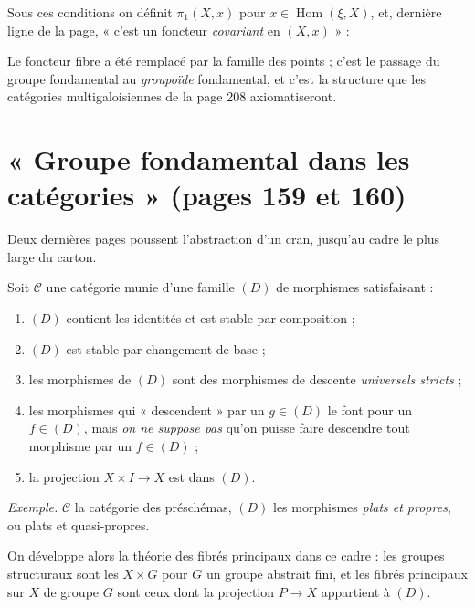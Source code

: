 \documentclass[11pt,a4paper]{article}
\begin{document}
Sous ces conditions on définit $\pi_{1}(X, x)$ pour $x \in
\operatorname{Hom}(\xi, X)$, et, dernière ligne de la page,
« c'est un foncteur \emph{covariant} en $(X, x)$ » :


Le foncteur fibre a été remplacé par la famille des points ; c'est le passage
du groupe fondamental au \emph{groupoïde} fondamental, et c'est la structure
que les catégories multigaloisiennes de la page 208 axiomatiseront.

\section*{« Groupe fondamental dans les catégories » (pages 159 et 160)}

Deux dernières pages poussent l'abstraction d'un cran, jusqu'au cadre le
plus large du carton.

Soit $\mathcal{C}$ une catégorie munie d'une famille $(D)$ de morphismes
satisfaisant :

\begin{enumerate}
  \item[(i)] $(D)$ contient les identités et est stable par composition ;
  \item[(ii)] $(D)$ est stable par changement de base ;
  \item[(iii)] les morphismes de $(D)$ sont des morphismes de descente
    \emph{universels stricts} ;
  \item[(iv)] les morphismes qui « descendent » par un $g \in (D)$ le font pour
    un $f \in (D)$, mais \emph{on ne suppose pas} qu'on puisse faire
    descendre tout morphisme par un $f \in (D)$ ;
  \item[(v)] la projection $X \times I \to X$ est dans $(D)$.
\end{enumerate}

\emph{Exemple.} $\mathcal{C}$ la catégorie des préschémas, $(D)$ les morphismes
\emph{plats et propres}, ou plats et quasi-propres.

On développe alors la théorie des fibrés principaux dans ce cadre : les groupes
structuraux sont les $X \times G$ pour $G$ un groupe abstrait fini, et les
fibrés principaux sur $X$ de groupe $G$ sont ceux dont la projection
$P \to X$ appartient à $(D)$.
\end{document}

